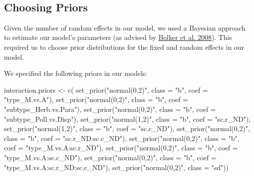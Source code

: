 \documentclass[11pt,]{article}
\newenvironment{Shaded}{}{}
\newcommand{\KeywordTok}[1]{\textcolor[rgb]{0.00,0.00,1.00}{#1}}
\newcommand{\DataTypeTok}[1]{#1}
\newcommand{\StringTok}[1]{\textcolor[rgb]{0.00,0.50,0.50}{#1}}
\newcommand{\NormalTok}[1]{#1}
\begin{document}
~

\subsection{Choosing Priors}\label{choosing-priors}

Given the number of random effects in our model, we used a Bayesian
approach to estimate our model's parameters (as advised by
\href{https://www.sciencedirect.com/science/article/pii/S0169534709000196}{Bolker
et al. 2008}). This required us to choose prior distributions for the
fixed and random effects in our model.

We specified the following priors in our models:

\begin{Shaded}
\begin{Highlighting}[]
\NormalTok{interaction.priors <-}\StringTok{ }\KeywordTok{c}\NormalTok{(}
  \KeywordTok{set_prior}\NormalTok{(}\StringTok{"normal(0,2)"}\NormalTok{, }\DataTypeTok{class =} \StringTok{"b"}\NormalTok{, }\DataTypeTok{coef =} \StringTok{"type_M.vs.A"}\NormalTok{),}
  \KeywordTok{set_prior}\NormalTok{(}\StringTok{"normal(0,2)"}\NormalTok{, }\DataTypeTok{class =} \StringTok{"b"}\NormalTok{, }\DataTypeTok{coef =} \StringTok{"subtype_Herb.vs.Para"}\NormalTok{),}
  \KeywordTok{set_prior}\NormalTok{(}\StringTok{"normal(0,2)"}\NormalTok{, }\DataTypeTok{class =} \StringTok{"b"}\NormalTok{, }\DataTypeTok{coef =} \StringTok{"subtype_Poll.vs.Disp"}\NormalTok{),}
  \KeywordTok{set_prior}\NormalTok{(}\StringTok{"normal(1,2)"}\NormalTok{, }\DataTypeTok{class =} \StringTok{"b"}\NormalTok{, }\DataTypeTok{coef =} \StringTok{"sc.r_ND"}\NormalTok{),}
  \KeywordTok{set_prior}\NormalTok{(}\StringTok{"normal(1,2)"}\NormalTok{, }\DataTypeTok{class =} \StringTok{"b"}\NormalTok{, }\DataTypeTok{coef =} \StringTok{"sc.c_ND"}\NormalTok{),}
  \KeywordTok{set_prior}\NormalTok{(}\StringTok{"normal(0,2)"}\NormalTok{, }\DataTypeTok{class =} \StringTok{"b"}\NormalTok{, }\DataTypeTok{coef =} \StringTok{"sc.r_ND:sc.c_ND"}\NormalTok{),}
  \KeywordTok{set_prior}\NormalTok{(}\StringTok{"normal(0,2)"}\NormalTok{, }\DataTypeTok{class =} \StringTok{"b"}\NormalTok{, }\DataTypeTok{coef =} \StringTok{"type_M.vs.A:sc.r_ND"}\NormalTok{),}
  \KeywordTok{set_prior}\NormalTok{(}\StringTok{"normal(0,2)"}\NormalTok{, }\DataTypeTok{class =} \StringTok{"b"}\NormalTok{, }\DataTypeTok{coef =} \StringTok{"type_M.vs.A:sc.c_ND"}\NormalTok{),}
  \KeywordTok{set_prior}\NormalTok{(}\StringTok{"normal(0,2)"}\NormalTok{, }\DataTypeTok{class =} \StringTok{"b"}\NormalTok{, }\DataTypeTok{coef =} \StringTok{"type_M.vs.A:sc.r_ND:sc.c_ND"}\NormalTok{),}
  \KeywordTok{set_prior}\NormalTok{(}\StringTok{"normal(0,2)"}\NormalTok{, }\DataTypeTok{class =} \StringTok{"sd"}\NormalTok{))}


\end{Highlighting}
\end{Shaded}
\end{document}
